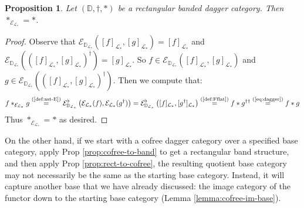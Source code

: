 \documentclass[10pt]{article}
\newtheorem{proposition}[observation]{Proposition}
\begin{document}
\begin{proposition}\label{prop:asE=ast}Let $(\mathbb{D}, \dagger, \ast)$ be a rectangular banded dagger category. Then $\ast_{\mathcal{E}_{\mathcal{L}_\ast}} = \ast$. 
\end{proposition}
\begin{proof} Observe that $\mathcal{E}_{\mathbb{D}_{\mathcal{L}_\ast}} \left( [f]_{\mathcal{L}_\ast}, [g]_{\mathcal{L}_\ast}\right) = [f]_{\mathcal{L}_\ast}$ and $\mathcal{E}_{\mathbb{D}_{\mathcal{L}_\ast}} \left( \left([f]_{\mathcal{L}_\ast}, [g]_{\mathcal{L}_\ast} \right)^\dagger \right) = [g]_{\mathcal{L}_\ast}$. So $f \in \mathcal{E}_{\mathbb{D}_{\mathcal{L}_\ast}} \left( [f]_{\mathcal{L}_\ast}, [g]_{\mathcal{L}_\ast}\right)$ and $g \in \mathcal{E}_{\mathbb{D}_{\mathcal{L}_\ast}} \left( \left([f]_{\mathcal{L}_\ast}, [g]_{\mathcal{L}_\ast} \right)^\dagger \right)$. Then we compute that: 
\begin{gather*} 
f \ast_{\mathcal{E}_{\mathcal{L}_\ast}} g \overset{\text{(\ref{def:ast-E})}}{=} \mathcal{E}^\flat_{\mathbb{D}_{\mathcal{L}_\ast}} \left(  \mathcal{E}_{\mathcal{L}_\ast}(f), \mathcal{E}_{\mathcal{L}_\ast}(g^\dagger) \right) = \mathcal{E}^\flat_{\mathbb{D}_{\mathcal{L}_\ast}} \left( [f]_{\mathcal{L}_\ast}, [g^\dagger]_{\mathcal{L}_\ast}\right) \overset{\text{(\ref{def:Fflat})}}{=} f \ast g^{\dagger \dagger} \overset{\text{(\ref{eq:dagger})}}{=} f \ast g
\end{gather*}
Thus $\ast_{\mathcal{E}_{\mathcal{L}_\ast}} = \ast$ as desired. 
\end{proof}

On the other hand, if we start with a cofree dagger category over a specified base category, apply Prop \ref{prop:cofree-to-band} to get a rectangular band structure, and then apply Prop \ref{prop:rect-to-cofree}, the resulting quotient base category may not necessarily be the same as the starting base category. Instead, it will capture another base that we have already discussed: the image category of the functor down to the starting base category (Lemma \ref{lemma:cofree-im-base}). 
\end{document}
